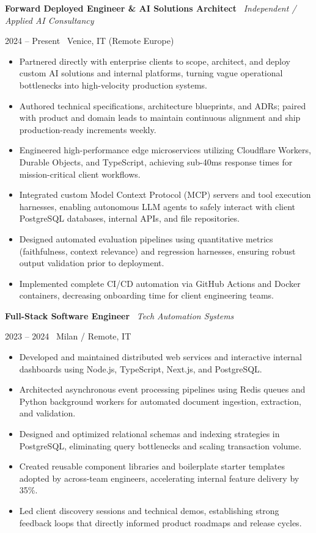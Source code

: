 \documentclass[a4paper,10pt]{article}
\newcommand{\role}[4]{%
  \vspace{2pt}\noindent
  \begin{minipage}[t]{0.70\textwidth}\raggedright\textbf{#1} \textbullet\ \textit{#3}\end{minipage}%
  \hfill
  \begin{minipage}[t]{0.28\textwidth}\raggedleft\footnotesize\color{gray}#2 \textbullet\ #4\end{minipage}%
  \vspace{1pt}%
}
\begin{document}
\role{Forward Deployed Engineer \& AI Solutions Architect}{2024 -- Present}{Independent / Applied AI Consultancy}{Venice, IT (Remote Europe)}
\begin{itemize}
  \item Partnered directly with enterprise clients to scope, architect, and deploy custom AI solutions and internal platforms, turning vague operational bottlenecks into high-velocity production systems.
  \item Authored technical specifications, architecture blueprints, and ADRs; paired with product and domain leads to maintain continuous alignment and ship production-ready increments weekly.
  \item Engineered high-performance edge microservices utilizing Cloudflare Workers, Durable Objects, and TypeScript, achieving sub-40ms response times for mission-critical client workflows.
  \item Integrated custom Model Context Protocol (MCP) servers and tool execution harnesses, enabling autonomous LLM agents to safely interact with client PostgreSQL databases, internal APIs, and file repositories.
  \item Designed automated evaluation pipelines using quantitative metrics (faithfulness, context relevance) and regression harnesses, ensuring robust output validation prior to deployment.
  \item Implemented complete CI/CD automation via GitHub Actions and Docker containers, decreasing onboarding time for client engineering teams.
\end{itemize}

\vspace{3pt}
\role{Full-Stack Software Engineer}{2023 -- 2024}{Tech Automation Systems}{Milan / Remote, IT}
\begin{itemize}
  \item Developed and maintained distributed web services and interactive internal dashboards using Node.js, TypeScript, Next.js, and PostgreSQL.
  \item Architected asynchronous event processing pipelines using Redis queues and Python background workers for automated document ingestion, extraction, and validation.
  \item Designed and optimized relational schemas and indexing strategies in PostgreSQL, eliminating query bottlenecks and scaling transaction volume.
  \item Created reusable component libraries and boilerplate starter templates adopted by across-team engineers, accelerating internal feature delivery by 35\%.
  \item Led client discovery sessions and technical demos, establishing strong feedback loops that directly informed product roadmaps and release cycles.
\end{itemize}
\end{document}
